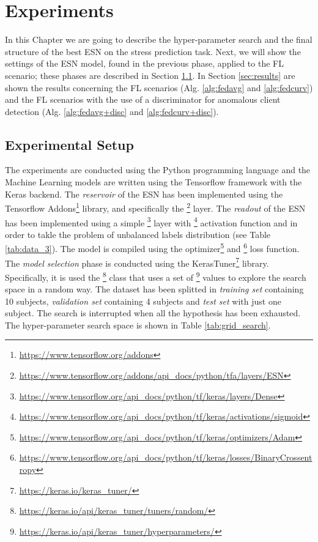 \chapter{Experiments}\label{chapter:experiments}

In this Chapter we are going to describe the hyper-parameter search and the final structure of the best ESN on the stress prediction task. Next, we will show the settings of the ESN model, found in the previous phase, applied to the FL scenario; these phases are described in Section \ref{sec:setup}. In Section \ref{sec:results} are shown the results concerning the FL scenarios (Alg. \ref{alg:fedavg} and \ref{alg:fedcurv}) and the FL scenarios with the use of a discriminator for anomalous client detection (Alg. \ref{alg:fedavg+disc} and \ref{alg:fedcurv+disc}).


\section{Experimental Setup}\label{sec:setup}

The experiments are conducted using the Python programming language and the Machine Learning models are written using the Tensorflow framework with the Keras backend. The \textit{reservoir} of the ESN has been implemented using the Tensorflow Addons\footnote{\url{https://www.tensorflow.org/addons}} library, and specifically the \footnote{\url{https://www.tensorflow.org/addons/api_docs/python/tfa/layers/ESN}} layer. The \textit{readout} of the ESN has been implemented using a simple \footnote{\url{https://www.tensorflow.org/api_docs/python/tf/keras/layers/Dense}} layer with \footnote{\url{https://www.tensorflow.org/api_docs/python/tf/keras/activations/sigmoid}} activation function and  in order to takle the problem of unbalanced labels distribution (see Table \ref{tab:data_3}). The model is compiled using the  optimizer\footnote{\url{https://www.tensorflow.org/api_docs/python/tf/keras/optimizers/Adam}} and \footnote{\url{https://www.tensorflow.org/api_docs/python/tf/keras/losses/BinaryCrossentropy}} loss function. \\

The \textit{model selection} phase is conducted using the KerasTuner\footnote{\url{https://keras.io/keras_tuner/}} library. Specifically, it is used the \footnote{\url{https://keras.io/api/keras_tuner/tuners/random/}} class that uses a set of \footnote{\url{https://keras.io/api/keras_tuner/hyperparameters/}} values to explore the search space in a random way. The dataset has been splitted in \textit{training set} containing 10 subjects, \textit{validation set} containing 4 subjects and \textit{test set} with just one subject. The search is interrupted when all the hypothesis has been exhausted. The hyper-parameter search space is shown in Table \ref{tab:grid_search}.


